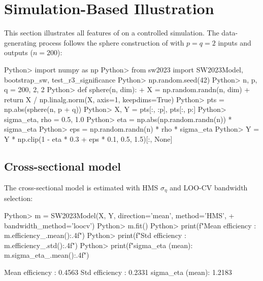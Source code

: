 \documentclass[article]{jss}
\begin{document}

\section[Simulation-based illustration]{Simulation-Based Illustration}
\label{sec:example}

This section illustrates all features of  on a controlled simulation.
The data-generating process follows the sphere construction of
\citet{Marsaglia1972} with $p = q = 2$ inputs and outputs ($n = 200$):
%
\begin{CodeChunk}
\begin{CodeInput}
Python> import numpy as np
Python> from sw2023 import SW2023Model, bootstrap_sw, test_r3_significance
Python> np.random.seed(42)
Python> n, p, q = 200, 2, 2
Python> def sphere(n, dim):
+           X = np.random.randn(n, dim)
+           return X / np.linalg.norm(X, axis=1, keepdims=True)
Python> pts = np.abs(sphere(n, p + q))
Python> X, Y = pts[:, :p], pts[:, p:]
Python> sigma_eta, rho = 0.5, 1.0
Python> eta = np.abs(np.random.randn(n)) * sigma_eta
Python> eps = np.random.randn(n) * rho * sigma_eta
Python> Y = Y * np.clip(1 - eta * 0.3 + eps * 0.1, 0.5, 1.5)[:, None]
\end{CodeInput}
\end{CodeChunk}

\subsection{Cross-sectional model}
\label{sec:example-cs}

The cross-sectional model is estimated with HMS $\hat\sigma_\eta$ and
LOO-CV bandwidth selection:
%
\begin{CodeChunk}
\begin{CodeInput}
Python> m = SW2023Model(X, Y, direction='mean', method='HMS',
+                       bandwidth_method='loocv')
Python> m.fit()
Python> print(f"Mean efficiency : {m.efficiency_.mean():.4f}")
Python> print(f"Std  efficiency : {m.efficiency_.std():.4f}")
Python> print(f"sigma_eta (mean): {m.sigma_eta_.mean():.4f}")
\end{CodeInput}
\begin{CodeOutput}
Mean efficiency : 0.4563
Std  efficiency : 0.2331
sigma_eta (mean): 1.2183
\end{CodeOutput}
\end{CodeChunk}
\end{document}

